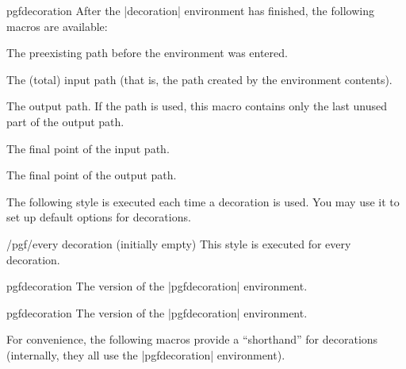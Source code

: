 \begin{environment}{{pgfdecoration}}
    After the |{decoration}| environment has finished, the following macros are
    available:

    \begin{command}{\pgfdecorateexistingpath}
        The preexisting path before the environment was entered.
    \end{command}

    \begin{command}{\pgfdecoratedpath}
        The (total) input path (that is, the path created by the environment
        contents).
    \end{command}

    \begin{command}{\pgfdecorationpath}
        The output path. If the path is used, this macro contains only the last
        unused part of the output path.
    \end{command}

    \begin{command}{\pgfpointdecoratedpathlast}
        The final point of the input path.
    \end{command}

    \begin{command}{\pgfpointdecorationpathlast}
        The final point of the output path.
    \end{command}

    The following style is executed each time a decoration is used. You may use
    it to set up default options for decorations.
    \begin{stylekey}{/pgf/every decoration (initially \normalfont empty)}
        This style is executed for every decoration.
    \end{stylekey}
\end{environment}

\begin{plainenvironment}{{pgfdecoration}}
    The  version of the |{pgfdecoration}| environment.
\end{plainenvironment}

\begin{contextenvironment}{{pgfdecoration}}
    The  version of the |{pgfdecoration}| environment.
\end{contextenvironment}

For convenience, the following macros provide a ``shorthand'' for decorations
(internally, they all use the |{pgfdecoration}| environment).

